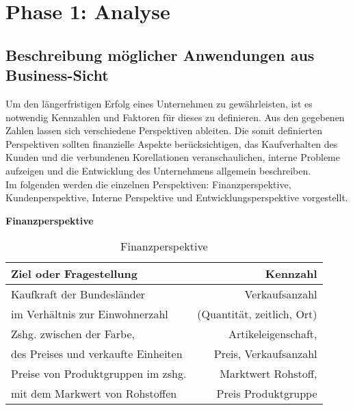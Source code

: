 \section{Phase 1: Analyse}

\subsection{Beschreibung möglicher Anwendungen aus Business-Sicht}
\label{ref:businessSicht}

Um den längerfristigen Erfolg eines Unternehmen zu gewährleisten, ist es notwendig Kennzahlen und Faktoren für dieses zu definieren. 
Aus den gegebenen Zahlen lassen sich verschiedene Perspektiven ableiten. 
Die somit definierten Perspektiven sollten finanzielle Aspekte berücksichtigen, das Kaufverhalten des Kunden und die verbundenen Korellationen veranschaulichen, interne Probleme aufzeigen und die Entwicklung des Unternehmens allgemein beschreiben.\\
Im folgenden werden die einzelnen Perspektiven: Finanzperspektive, Kundenperspektive, Interne Perspektive und Entwicklungsperspektive vorgestellt.

\begin{table}[h]
\textbf{Finanzperspektive}
\begin{center}
  \begin{tabular}{ | l | r | }
    \hline
    \textbf{Ziel oder Fragestellung} & \textbf{Kennzahl} \\ \hline
    Kaufkraft der Bundesländer & Verkaufsanzahl \\  im Verhältnis zur Einwohnerzahl & (Quantität, zeitlich, Ort) \\ \hline
    Zshg. zwischen der Farbe, & Artikeleigenschaft,  \\ des Preises und verkaufte Einheiten & Preis, Verkaufsanzahl \\ \hline
    Preise von Produktgruppen im zshg. & Marktwert Rohstoff, \\ mit dem Markwert von Rohstoffen & Preis Produktgruppe \\ \hline
  \end{tabular}
\end{center}
\caption{Finanzperspektive}
\label{table:tableFinanz}
\end{table}

